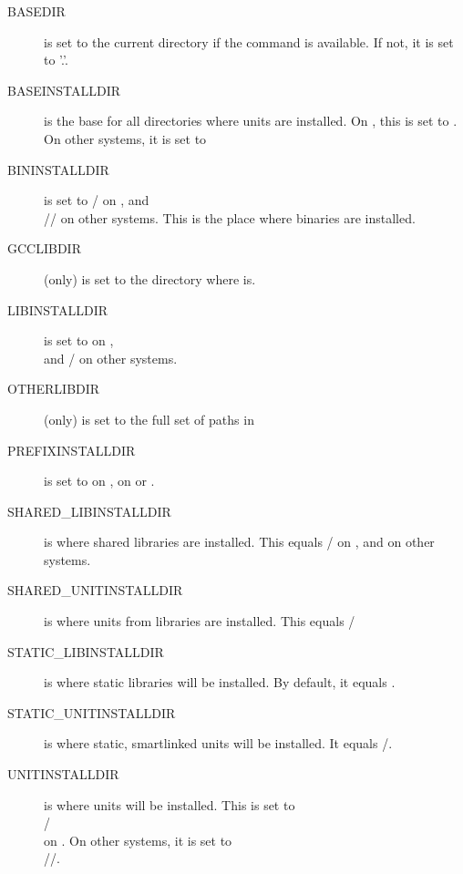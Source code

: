 \documentclass{report}
\begin{document}
\begin{description}
\item[BASEDIR] is set to the current directory if the  command is
available. If not, it is set to '.'.

\item[BASEINSTALLDIR] is the base for all directories where units are
installed. On \linux, this is set to
.\\ On other systems,
it is set to 

\item[BININSTALLDIR] is set to / on \linux,
and\\
// on other systems. This is
the place where binaries are installed.

\item[GCCLIBDIR] (\linux only) is set to the directory where 
is.

\item[LIBINSTALLDIR] is set to  on \linux,\\
 and / on other systems.

\item[OTHERLIBDIR] (\linux only) is set to the full set of paths in 

\item[PREFIXINSTALLDIR] is set to  on \linux,  on \dos
or \windowsnt.

\item[SHARED\_LIBINSTALLDIR] is where shared libraries are 
installed. This equals / on \linux, and
 on other systems.

\item[SHARED\_UNITINSTALLDIR] is where units from libraries are 
installed. This equals /

\item[STATIC\_LIBINSTALLDIR] is where static libraries will be
installed. By default, it equals .

\item[STATIC\_UNITINSTALLDIR] is where static, smartlinked units will be
installed. It equals /.

\item[UNITINSTALLDIR] is where units will be installed. This is set to\\
/ \\
on \linux. On other systems, it is set to \\
//.
\end{description}
\end{document}
